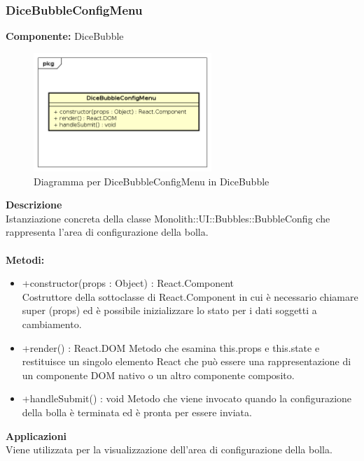 \subsubsection{DiceBubbleConfigMenu}
\textbf{Componente:}  DiceBubble\\
   \FloatBarrier
   \begin{figure}[ht]
   \centering
   \includegraphics[width=0.6\textwidth]{img/single-DiceBubbleConfigMenu}
   \caption{{Diagramma per DiceBubbleConfigMenu in DiceBubble}}
\end{figure}
\FloatBarrier
\textbf{Descrizione}\\
Istanziazione concreta della classe Monolith::UI::Bubbles::BubbleConfig che rappresenta l'area di configurazione della bolla. 
\\
\\
\textbf{Metodi:} 
\begin{itemize}
\item +constructor(props : Object) : React.Component 
\\
Costruttore della sottoclasse di React.Component in cui è necessario chiamare super (props) ed è possibile inizializzare lo stato per i dati soggetti a cambiamento.

\item +render() : React.DOM
Metodo che esamina this.props e this.state e restituisce un singolo elemento React che può essere una rappresentazione di un componente DOM nativo o un altro componente composito.

\item +handleSubmit() : void
Metodo che viene invocato quando la configurazione della bolla è terminata ed è pronta per essere inviata.

\end{itemize} 


\textbf{Applicazioni}\\
Viene utilizzata per la visualizzazione dell'area di configurazione della bolla. 


\clearpage

